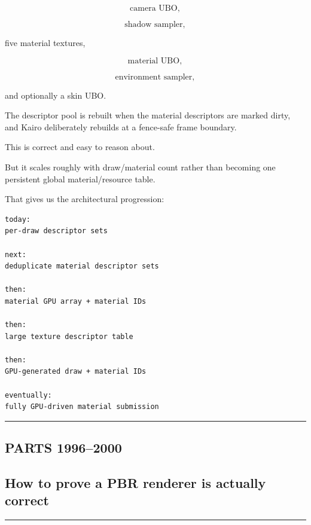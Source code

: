\[
\text{camera UBO},
\]

\[
\text{shadow sampler},
\]

five material textures,

\[
\text{material UBO},
\]

\[
\text{environment sampler},
\]

and optionally a skin UBO.

The descriptor pool is rebuilt when the material descriptors are marked dirty, and Kairo deliberately rebuilds at a fence-safe frame boundary.

This is correct and easy to reason about.

But it scales roughly with draw/material count rather than becoming one persistent global material/resource table.

That gives us the architectural progression:

\begin{verbatim}
today:
per-draw descriptor sets

next:
deduplicate material descriptor sets

then:
material GPU array + material IDs

then:
large texture descriptor table

then:
GPU-generated draw + material IDs

eventually:
fully GPU-driven material submission
\end{verbatim}

\begin{center}\rule{0.5\linewidth}{0.5pt}\end{center}

\subsection{PARTS 1996--2000}\label{03-visual-computing-i-ch006-parts-19962000}

\hypertarget{03-visual-computing-i-ch006-parts-19962000}{}

\subsection{How to prove a PBR renderer is actually correct}\label{03-visual-computing-i-ch006-how-to-prove-a-pbr-renderer-is-actually-correct}

\hypertarget{03-visual-computing-i-ch006-how-to-prove-a-pbr-renderer-is-actually-correct}{}

\begin{center}\rule{0.5\linewidth}{0.5pt}\end{center}

